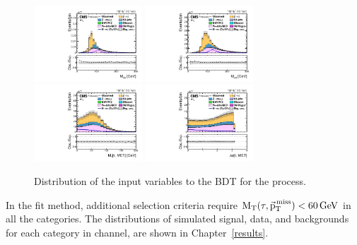 \begin{figure}[htbp!]
  \includegraphics[width=0.36\textwidth]{plots/chapter6/etau/e_t_Mass.pdf}
  \includegraphics[width=0.36\textwidth]{plots/chapter6/etau/e_t_CollinearMass.pdf}\\
  \includegraphics[width=0.36\textwidth]{plots/chapter6/etau/MTTauMET.pdf}
  \includegraphics[width=0.36\textwidth]{plots/chapter6/etau/dPhiTauMET.pdf}\\
  \caption{Distribution of the input variables to the BDT for the \ehad process.}
  \label{fig:input_et}
\end{figure}

In the \mcol fit method, additional selection criteria require $\text{M}_\mathrm{T}(\tau,{\vec{\text{p}}}_{\mathrm{T}}^{\kern1pt\text{miss}}) < 60 \,\text{Ge\hspace{-.08em}V}$ in all the categories. The \mcol distributions of simulated signal, data, and backgrounds for each category in \ehad channel, are shown in Chapter~\ref{results}.

